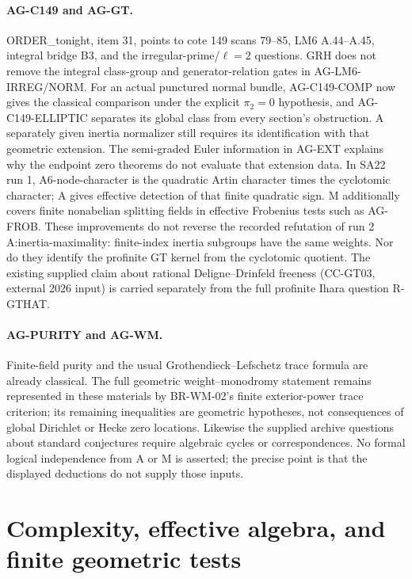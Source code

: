 \documentclass[11pt,a4paper]{article}
\begin{document}
\paragraph{AG-C149 and AG-GT.} ORDER\_tonight, item 31, points to cote
149 scans 79--85, LM6 A.44--A.45, integral bridge B3, and the
irregular-prime/$\ell=2$ questions. GRH does not remove the integral
class-group and generator-relation gates in AG-LM6-IRREG/NORM.
For an actual punctured normal bundle, AG-C149-COMP now gives the
classical comparison under the explicit $\pi_2=0$ hypothesis, and
AG-C149-ELLIPTIC separates its global class from every section's
obstruction. A separately given inertia normalizer still requires
its identification with that geometric extension.
The semi-graded Euler information in AG-EXT explains why the endpoint
zero theorems do not evaluate that extension data. In SA22 run 1,
A6-node-character is the quadratic Artin character times the cyclotomic
character; A gives effective detection of that finite quadratic sign.
M additionally covers finite nonabelian splitting fields in effective
Frobenius tests such as AG-FROB. These improvements do not reverse the
recorded refutation of run 2 A:inertia-maximality: finite-index inertia
subgroups have the same weights. Nor do they identify the profinite GT
kernel from the cyclotomic quotient. The existing supplied claim about
rational Deligne--Drinfeld freeness (CC-GT03, external 2026 input) is
carried separately from the full profinite Ihara question R-GTHAT.

\paragraph{AG-PURITY and AG-WM.} Finite-field purity and the usual
Grothendieck--Lefschetz trace formula are already classical. The full
geometric weight--monodromy statement remains represented in these
materials by BR-WM-02's finite exterior-power trace criterion; its
remaining inequalities are geometric hypotheses, not consequences of
global Dirichlet or Hecke zero locations. Likewise the supplied archive
questions about standard conjectures require algebraic cycles or
correspondences. No formal logical independence from A or M is asserted;
the precise point is that the displayed deductions do not supply those
inputs.


\section{Complexity, effective algebra, and finite geometric tests}
\label{sec:complexity}
\end{document}
